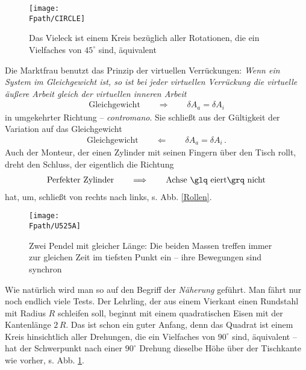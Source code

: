 \begin{figure}[tbp]
\if {} \sidecaption \fi
\texttt{[image: \\Fpath/CIRCLE]}
\caption{Das Vieleck ist einem Kreis bez\"{u}glich aller Rotationen, die ein Vielfaches von $45^\circ$ sind, \"{a}quivalent} \label{Circle}
\end{figure}%
Die Marktfrau benutzt das Prinzip der virtuellen Verr\"{u}ckungen: {\em Wenn ein System im Gleichgewicht ist, so ist bei jeder virtuellen Ver\-r\"{u}ck\-ung die virtuelle \"{a}u{\ss}ere Arbeit gleich der virtuellen inneren Arbeit}
\begin{align}
 \mbox{Gleichgewicht} \qquad
\Longrightarrow \qquad \delta A_a = \delta A_i
\end{align}
in umgekehrter Richtung -- {\em contromano\/}. Sie schlie{\ss}t aus der G\"{u}ltigkeit der Variation auf das Gleichgewicht
\begin{align}
 \mbox{Gleichgewicht} \qquad \Longleftarrow
\qquad \delta A_a = \delta A_i\,.
\end{align}
Auch der Monteur, der einen Zylinder mit seinen Fingern \"{u}ber den Tisch rollt, dreht den Schluss, der eigentlich die Richtung
\begin{align}
\text{Perfekter Zylinder} \qquad \Longrightarrow \qquad \text{Achse \glq eiert\grq\ nicht}\nn
\end{align}
hat, um, schlie{\ss}t von rechts nach links, s. Abb. \ref{Rollen}.
\begin{figure}[tbp] \centering
\if {} \sidecaption \fi
\texttt{[image: \\Fpath/U525A]}
\caption{Zwei Pendel mit gleicher L\"{a}nge: Die beiden Massen treffen immer zur gleichen Zeit im tiefsten Punkt ein -- ihre Bewegungen sind synchron} \label{U525}
\end{figure}%

Wie nat\"{u}rlich wird man so auf den Begriff der {\em N\"{a}herung\/} gef\"{u}hrt. Man f\"{a}hrt nur noch endlich viele Tests. Der Lehrling, der aus einem Vierkant einen Rundstahl mit Radius $R$ schleifen soll, beginnt mit einem quadratischen Eisen mit der Kantenl\"{a}nge $2\,R$. Das ist schon ein guter Anfang, denn das Quadrat ist einem Kreis hinsichtlich aller Drehungen, die ein Vielfaches von $90^\circ$ sind, \"{a}quivalent -- hat der Schwerpunkt nach einer $90^\circ$ Drehung dieselbe H\"{o}he \"{u}ber der Tischkante wie vorher, s. Abb. \ref{Circle}.

